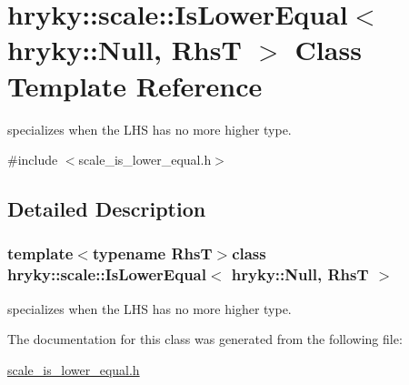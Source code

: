 \hypertarget{classhryky_1_1scale_1_1_is_lower_equal_3_01hryky_1_1_null_00_01_rhs_t_01_4}{\section{hryky\-:\-:scale\-:\-:Is\-Lower\-Equal$<$ hryky\-:\-:Null, Rhs\-T $>$ Class Template Reference}
\label{classhryky_1_1scale_1_1_is_lower_equal_3_01hryky_1_1_null_00_01_rhs_t_01_4}
}


specializes when the L\-H\-S has no more higher type.  




{\ttfamily \#include $<$scale\-\_\-is\-\_\-lower\-\_\-equal.\-h$>$}



\subsection{Detailed Description}
\subsubsection*{template$<$typename Rhs\-T$>$class hryky\-::scale\-::\-Is\-Lower\-Equal$<$ hryky\-::\-Null, Rhs\-T $>$}

specializes when the L\-H\-S has no more higher type. 

The documentation for this class was generated from the following file\-:\begin{DoxyCompactItemize}
\item 
\hyperlink{scale__is__lower__equal_8h}{scale\-\_\-is\-\_\-lower\-\_\-equal.\-h}\end{DoxyCompactItemize}
